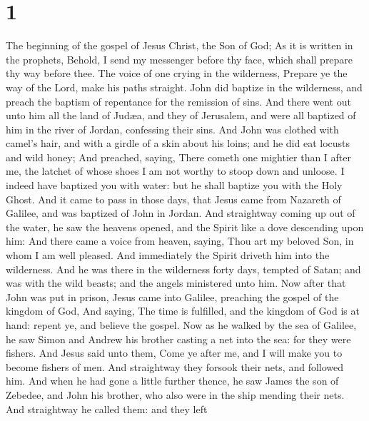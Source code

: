\hypertarget{section}{%
\section{1}\label{section}}

 The beginning of the gospel of Jesus Christ, the Son of
God;  As it is written in the prophets, Behold, I send my
messenger before thy face, which shall prepare thy way before thee.
 The voice of one crying in the wilderness, Prepare ye the
way of the Lord, make his paths straight.  John did
baptize in the wilderness, and preach the baptism of repentance for the
remission of sins.  And there went out unto him all the
land of Judæa, and they of Jerusalem, and were all baptized of him in
the river of Jordan, confessing their sins.  And John was
clothed with camel's hair, and with a girdle of a skin about his loins;
and he did eat locusts and wild honey;  And preached,
saying, There cometh one mightier than I after me, the latchet of whose
shoes I am not worthy to stoop down and unloose.  I indeed
have baptized you with water: but he shall baptize you with the Holy
Ghost.  And it came to pass in those days, that Jesus came
from Nazareth of Galilee, and was baptized of John in Jordan.
 And straightway coming up out of the water, he saw the
heavens opened, and the Spirit like a dove descending upon him:
 And there came a voice from heaven, saying, Thou art my
beloved Son, in whom I am well pleased.  And immediately
the Spirit driveth him into the wilderness.  And he was
there in the wilderness forty days, tempted of Satan; and was with the
wild beasts; and the angels ministered unto him.  Now
after that John was put in prison, Jesus came into Galilee, preaching
the gospel of the kingdom of God,  And saying, The time
is fulfilled, and the kingdom of God is at hand: repent ye, and believe
the gospel.  Now as he walked by the sea of Galilee, he
saw Simon and Andrew his brother casting a net into the sea: for they
were fishers.  And Jesus said unto them, Come ye after
me, and I will make you to become fishers of men.  And
straightway they forsook their nets, and followed him. 
And when he had gone a little further thence, he saw James the son of
Zebedee, and John his brother, who also were in the ship mending their
nets.  And straightway he called them: and they left
